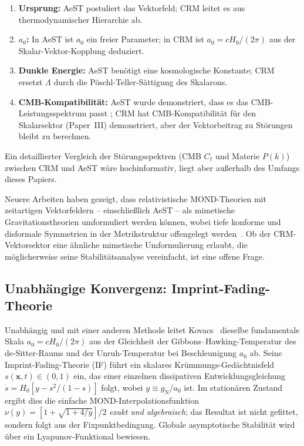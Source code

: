 \documentclass[aps,prd,twocolumn,superscriptaddress,nofootinbib]{revtex4-2}
\begin{document}
\begin{enumerate}
\item \textbf{Ursprung:} AeST postuliert das Vektorfeld; CRM leitet es aus thermodynamischer Hierarchie ab.
\item \textbf{$a_0$:} In AeST ist $a_0$ ein freier Parameter; in CRM ist $a_0 = cH_0/(2\pi)$ aus der Skalar-Vektor-Kopplung deduziert.
\item \textbf{Dunkle Energie:} AeST ben\"otigt eine kosmologische Konstante; CRM ersetzt $\Lambda$ durch die P\"oschl-Teller-S\"attigung des Skalarons.
\item \textbf{CMB-Kompatibilit\"at:} AeST wurde demonstriert, dass es das CMB-Leistungsspektrum passt \cite{Skordis2021}; CRM hat CMB-Kompatibilit\"at f\"ur den Skalarsektor (Paper~III) demonstriert, aber der Vektorbeitrag zu St\"orungen bleibt zu berechnen.
\end{enumerate}

Ein detaillierter Vergleich der St\"orungsspektren (CMB $C_\ell$ und Materie $P(k)$) zwischen CRM und AeST w\"are hochinformativ, liegt aber au\ss{}erhalb des Umfangs dieses Papiers.

Neuere Arbeiten haben gezeigt, dass relativistische MOND-Theorien mit zeitartigen Vektorfeldern -- einschlie\ss{}lich AeST -- als mimetische Gravitationstheorien umformuliert werden k\"onnen, wobei tiefe konforme und disformale Symmetrien in der Metrikstruktur offengelegt werden~\cite{DomenechGanz2025}. Ob der CRM-Vektorsektor eine \"ahnliche mimetische Umformulierung erlaubt, die m\"oglicherweise seine Stabilit\"atsanalyse vereinfacht, ist eine offene Frage.

\subsection{Unabh\"angige Konvergenz: Imprint-Fading-Theorie}

Unabh\"angig und mit einer anderen Methode leitet Kovacs~\cite{Kovacs2026} dieselbe fundamentale Skala $a_0 = cH_0/(2\pi)$ aus der Gleichheit der Gibbons--Hawking-Temperatur des de-Sitter-Raums und der Unruh-Temperatur bei Beschleunigung $a_0$ ab. Seine Imprint-Fading-Theorie (IF) f\"uhrt ein skalares Kr\"ummungs-Ged\"achtnisfeld $s(\mathbf{x},t) \in (0,1)$ ein, das einer einzelnen dissipativen Entwicklungsgleichung $\dot{s} = H_0[y - s^2/(1-s)]$ folgt, wobei $y \equiv g_\mathrm{N}/a_0$ ist. Im station\"aren Zustand ergibt dies die einfache MOND-Interpolationsfunktion $\nu(y) = [1 + \sqrt{1+4/y}]/2$ \emph{exakt und algebraisch}; das Resultat ist nicht gefittet, sondern folgt aus der Fixpunktbedingung. Globale asymptotische Stabilit\"at wird \"uber ein Lyapunov-Funktional bewiesen.
\end{document}

